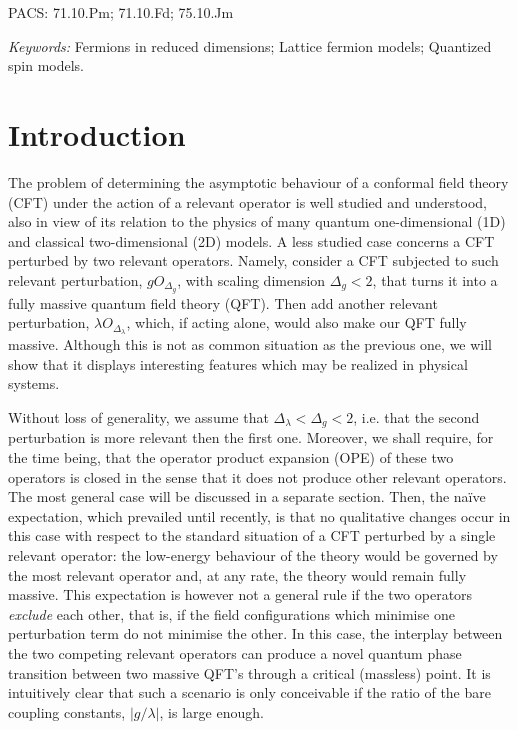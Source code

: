 \noindent
PACS: 71.10.Pm; 71.10.Fd; 75.10.Jm

\noindent
{\sl Keywords:} Fermions in reduced dimensions; Lattice fermion models;
Quantized spin models.
\section{Introduction}

The problem of determining the asymptotic behaviour of a conformal field
theory (CFT) under the action of a relevant operator is well studied and
understood, also in view of its relation to the physics of many
quantum one-dimensional (1D) and classical two-dimensional (2D)
models.
A less studied case concerns a CFT
perturbed by two relevant operators.
Namely, consider a CFT subjected to such relevant
perturbation, $g O_{\Delta_g}$,
with scaling dimension $\Delta_g < 2$,
that turns
it into a fully massive quantum field
theory (QFT).
Then add another relevant perturbation,
$\lambda O_{\Delta_\lambda}$,
which, if acting alone, would also make
our QFT fully massive.
Although this is not as common situation as the previous one,
we will show that it displays interesting features which
may be realized in physical systems.

Without loss of generality, we
assume that $\Delta_\lambda<\Delta_g<2$,
i.e. that the second perturbation is more relevant
then the first one. Moreover,
we shall require, for the time being, that the operator
product expansion (OPE) of these two
operators is closed in the sense that it
does not produce other relevant operators. The most general case
will be discussed in a separate section.
Then, the na\"{i}ve expectation, which prevailed until recently,
is that no qualitative changes occur in this case with respect to the
standard situation of a CFT perturbed by a single relevant operator:
the low-energy behaviour of the theory
would be governed by the most relevant operator
and, at any rate, the theory would remain
fully massive.
This expectation is however not a general rule if the
two operators {\sl exclude} each other, that is, if the
field configurations which minimise one perturbation term
do not minimise the other.
In this case, the interplay between the two competing
relevant operators
can produce a novel quantum phase transition between two massive QFT's
through a critical (massless) point. It is intuitively clear that
such a scenario is only conceivable if the ratio of the
bare coupling constants, $|g/\lambda|$, is large enough.

